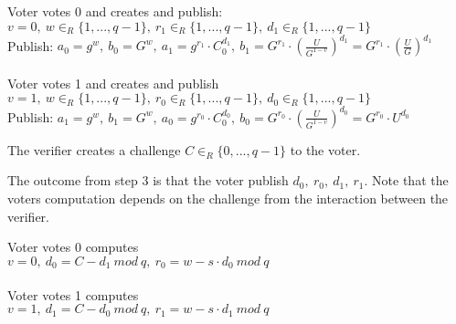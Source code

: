 \noindent
\begin{infobox}[Step 1]
Voter votes 0 and creates and publish:\\
\begin{math}v=0,\ w\in_R \{1,...,q-1\},\ r_1\in_R\{1,...,q-1\},\ d_1\in_R\{1,...,q-1\}\end{math}\\
Publish: \begin{math}a_0 = g^w,\ b_0 = G^w,\ a_1 = g^{r_1} \cdot C^{d_1}_0,\ b_1 = G^{r_1}  \cdot  (\frac{U}{G^{1-v}})^{d_1} = G^{r_1}  \cdot  (\frac{U}{G})^{d_1} \end{math}\\\\
Voter votes 1 and creates and publish\\
\begin{math}v=1,\ w\in_R \{1,...,q-1\},\ r_0\in_R\{1,...,q-1\},\ d_0\in_R\{1,...,q-1\}\end{math}\\
Publish: \begin{math}a_1 = g^w,\ b_1 = G^w,\ a_0 = g^{r_0} \cdot C^{d_0}_0,\ b_0 = G^{r_0}  \cdot  (\frac{U}{G^{1-v}})^{d_0}=  G^{r_0}  \cdot  U^{d_0} \end{math}
\end{infobox}

\noindent
\begin{infobox}[Step 2]
The verifier creates a challenge \begin{math}C\in_R \{0,...,q-1\}\end{math} to the voter.
\end{infobox}

\noindent
The outcome from step 3 is that the voter publish \begin{math}d_0,\ r_0,\ d_1,\ r_1\end{math}. Note that the voters computation depends on the challenge from the interaction between the verifier.

\noindent
\begin{infobox}[Step 3]
Voter votes 0 computes\\
\begin{math}v=0,\ d_0= C-d_1\ mod\ q, \ r_0=w-s \cdot d_0 \ mod\ q\end{math}\\\\
Voter votes 1 computes\\
\begin{math}v=1,\ d_1= C-d_0\ mod\ q, \ r_1=w-s \cdot d_1 \ mod\ q\end{math}
\end{infobox}

